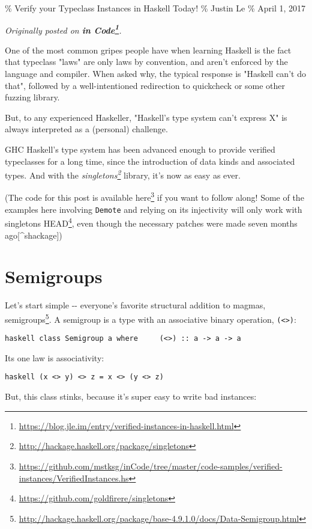 \documentclass[]{article}
\renewcommand{\href}[2]{#2\footnote{\url{#1}}}
\begin{document}
\% Verify your Typeclass Instances in Haskell Today! \% Justin Le \% April 1,
2017

\emph{Originally posted on
\textbf{\href{https://blog.jle.im/entry/verified-instances-in-haskell.html}{in
Code}}.}

One of the most common gripes people have when learning Haskell is the fact that
typeclass "laws" are only laws by convention, and aren't enforced by the
language and compiler. When asked why, the typical response is "Haskell can't do
that", followed by a well-intentioned redirection to quickcheck or some other
fuzzing library.

But, to any experienced Haskeller, "Haskell's type system can't express X" is
always interpreted as a (personal) challenge.

GHC Haskell's type system has been advanced enough to provide verified
typeclasses for a long time, since the introduction of data kinds and associated
types. And with the
\emph{\href{http://hackage.haskell.org/package/singletons}{singletons}} library,
it's now as easy as ever.

(The code for this post is available
\href{https://github.com/mstksg/inCode/tree/master/code-samples/verified-instances/VerifiedInstances.hs}{here}
if you want to follow along! Some of the examples here involving \texttt{Demote}
and relying on its injectivity will only work with
\href{https://github.com/goldfirere/singletons}{singletons HEAD}, even though
the necessary patches were made seven months ago{[}\^{}shackage{]})

\section{Semigroups}

Let's start simple -\/- everyone's favorite structural addition to magmas,
\href{http://hackage.haskell.org/package/base-4.9.1.0/docs/Data-Semigroup.html}{semigroups}.
A semigroup is a type with an associative binary operation,
\texttt{(\textless{}\textgreater{})}:

\texttt{haskell\ class\ Semigroup\ a\ where\ \ \ \ \ (\textless{}\textgreater{})\ ::\ a\ -\textgreater{}\ a\ -\textgreater{}\ a}

Its one law is associativity:

\texttt{haskell\ (x\ \textless{}\textgreater{}\ y)\ \textless{}\textgreater{}\ z\ =\ x\ \textless{}\textgreater{}\ (y\ \textless{}\textgreater{}\ z)}

But, this class stinks, because it's super easy to write bad instances:
\end{document}
